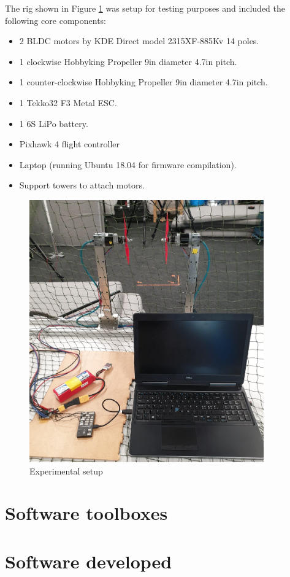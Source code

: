 The rig shown in Figure \ref{fig:exp_setup} was setup for testing purposes and included the following core components:
\begin{itemize}
	\item 2 BLDC motors by KDE Direct model 2315XF-885Kv 14 poles.
	\item 1 clockwise Hobbyking Propeller 9in diameter 4.7in pitch.
	\item 1 counter-clockwise Hobbyking Propeller 9in diameter 4.7in pitch.
	\item 1 Tekko32 F3 Metal ESC.
	\item 1 6S LiPo battery.
	\item Pixhawk 4 flight controller
	\item Laptop (running Ubuntu 18.04 for firmware compilation).
	\item Support towers to attach motors.
\end{itemize}
\begin{figure}
    \centering
    \includegraphics[width=0.9\textwidth]{images/setup_photo.png}
    \caption{Experimental setup}
    \label{fig:exp_setup}
\end{figure}

\section{Software toolboxes}


\section{Software developed}